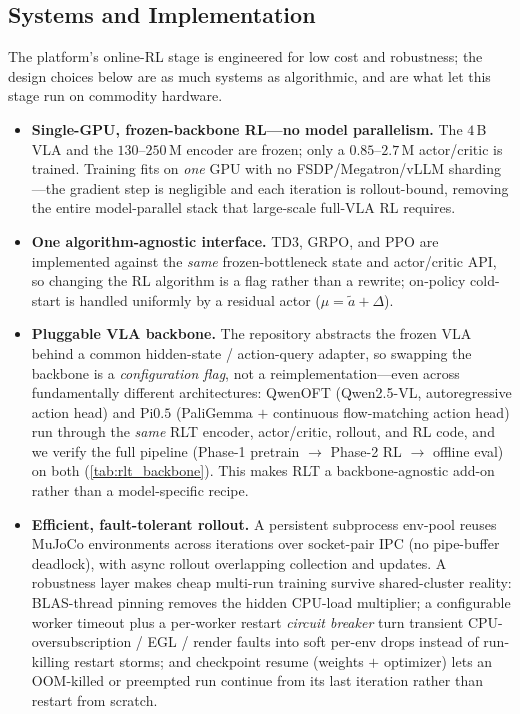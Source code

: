 \subsection{Systems and Implementation}
\label{sec:rlt_impl}
The platform's online-RL stage is engineered for low cost and robustness; the design choices below are as much systems as algorithmic, and are what let this stage run on commodity hardware.
\begin{itemize}[leftmargin=1.3em,itemsep=2pt,topsep=2pt]
  \item \textbf{Single-GPU, frozen-backbone RL---no model parallelism.} The $4$\,B VLA and the $130$--$250$\,M encoder are frozen; only a $0.85$--$2.7$\,M actor/critic is trained. Training fits on \emph{one} GPU with no FSDP/Megatron/vLLM sharding---the gradient step is negligible and each iteration is rollout-bound, removing the entire model-parallel stack that large-scale full-VLA RL requires.
  \item \textbf{One algorithm-agnostic interface.} TD3, GRPO, and PPO are implemented against the \emph{same} frozen-bottleneck state and actor/critic API, so changing the RL algorithm is a flag rather than a rewrite; on-policy cold-start is handled uniformly by a residual actor ($\mu=\tilde a+\Delta$).
  \item \textbf{Pluggable VLA backbone.} The repository abstracts the frozen VLA behind a common hidden-state / action-query adapter, so swapping the backbone is a \emph{configuration flag}, not a reimplementation---even across fundamentally different architectures: QwenOFT (Qwen2.5-VL, autoregressive action head) and Pi$0.5$ (PaliGemma $+$ continuous flow-matching action head) run through the \emph{same} RLT encoder, actor/critic, rollout, and RL code, and we verify the full pipeline (Phase-1 pretrain $\to$ Phase-2 RL $\to$ offline eval) on both (\cref{tab:rlt_backbone}). This makes RLT a backbone-agnostic add-on rather than a model-specific recipe.
  \item \textbf{Efficient, fault-tolerant rollout.} A persistent subprocess env-pool reuses MuJoCo environments across iterations over socket-pair IPC (no pipe-buffer deadlock), with async rollout overlapping collection and updates. A robustness layer makes cheap multi-run training survive shared-cluster reality: BLAS-thread pinning removes the hidden CPU-load multiplier; a configurable worker timeout plus a per-worker restart \emph{circuit breaker} turn transient CPU-oversubscription / EGL / render faults into soft per-env drops instead of run-killing restart storms; and checkpoint resume (weights $+$ optimizer) lets an OOM-killed or preempted run continue from its last iteration rather than restart from scratch.
\end{itemize}
